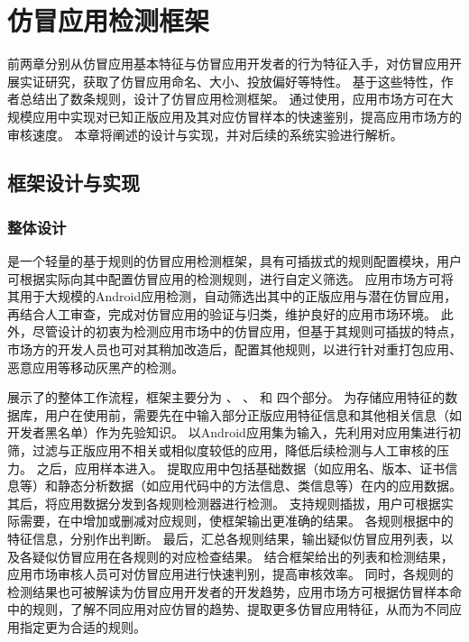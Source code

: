 \chapter{仿冒应用检测框架\mytool}
\label{chp:framework_prototype}

前两章分别从仿冒应用基本特征与仿冒应用开发者的行为特征入手，对仿冒应用开展实证研究，获取了仿冒应用命名、大小、投放偏好等特性。
基于这些特性，作者总结出了数条规则，设计了仿冒应用检测框架\mytool 。
通过使用\mytool ，应用市场方可在大规模应用中实现对已知正版应用及其对应仿冒样本的快速鉴别，提高应用市场方的审核速度。
本章将阐述\mytool 的设计与实现，并对后续的系统实验进行解析。

\section{框架设计与实现}

\subsection{整体设计}
\mytool 是一个轻量的基于规则的仿冒应用检测框架，具有可插拔式的规则配置模块，用户可根据实际向其中配置仿冒应用的检测规则，进行自定义筛选。
应用市场方可将其用于大规模的Android应用检测，自动筛选出其中的正版应用与潜在仿冒应用，再结合人工审查，完成对仿冒应用的验证与归类，维护良好的应用市场环境。
此外，尽管\mytool 设计的初衷为检测应用市场中的仿冒应用，但基于其规则可插拔的特点，市场方的开发人员也可对其稍加改造后，配置其他规则，以进行针对重打包应用、恶意应用等移动灰黑产的检测。


展示了\mytool 的整体工作流程，框架主要分为\textbf{\componentA} 、\textbf{\componentB} 、\textbf{\componentC} 和\textbf{\componentD} 四个部分。
\componentD 为存储应用特征的数据库，用户在使用前，需要先在\componentD 中输入部分正版应用特征信息和其他相关信息（如开发者黑名单）作为先验知识。
\mytool 以Android应用集为输入，先利用\componentA 对应用集进行初筛，过滤与正版应用不相关或相似度较低的应用，降低后续检测与人工审核的压力。
之后，应用样本进入\componentB 。
\componentB 提取应用中包括基础数据（如应用名、版本、证书信息等）和静态分析数据（如应用代码中的方法信息、类信息等）在内的应用数据。
其后，\componentC 将应用数据分发到各规则检测器进行检测。
\componentC 支持规则插拔，用户可根据实际需要，在\componentC 中增加或删减对应规则，使框架输出更准确的结果。
各规则根据\componentD 中的特征信息，分别作出判断。
最后，\componentC 汇总各规则结果，输出疑似仿冒应用列表，以及各疑似仿冒应用在各规则的对应检查结果。
结合框架给出的列表和检测结果，应用市场审核人员可对仿冒应用进行快速判别，提高审核效率。
同时，各规则的检测结果也可被解读为仿冒应用开发者的开发趋势，应用市场方可根据仿冒样本命中的规则，了解不同应用对应仿冒的趋势、提取更多仿冒应用特征，从而为不同应用指定更为合适的规则。

